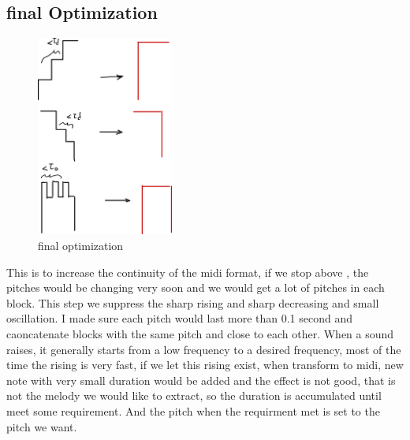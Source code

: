 \documentclass[twoside]{article}
\begin{document}
\subsection{final Optimization}
\begin{multicols}{2}
\begin{figure}[H]
   \centering
   \includegraphics[width = 0.4\textwidth]{final_op.png}  
   \caption{final optimization}
\end{figure}
This is to increase the continuity of the midi format, if we stop above , the pitches would be changing very soon and we would get a lot of pitches in each block. This step we suppress the sharp rising and sharp decreasing and small oscillation. I made sure each pitch would last more than 0.1 second and caoncatenate blocks with the same pitch and close to each other.  When a sound raises, it generally starts from a low frequency to a desired frequency, most of the time the rising is very fast, if we let this rising exist, when transform to midi, new note with very small duration would be added and the effect is not good, that is not the melody we would like to extract, so the duration is accumulated until meet some requirement. And the pitch when the requirment met is set to the pitch we want.
\end{multicols}
\end{document}
